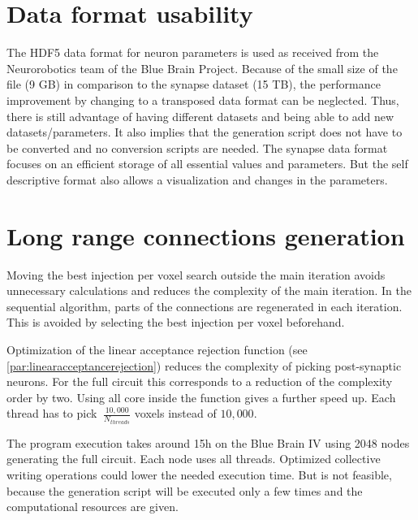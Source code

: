 \section{Data format usability}
The HDF5 data format for neuron parameters is used as received from the Neurorobotics team of the Blue Brain Project.
Because of the small size of the file (9 GB) in comparison to the synapse dataset (15 TB), the performance improvement by changing
to a transposed data format can be neglected. Thus, there is still advantage of having different datasets and being able
to add new datasets/parameters. It also implies that the generation script does not have to be converted and no 
conversion scripts are needed. The synapse data format focuses on an efficient storage of all essential values and parameters.
But the self descriptive format also allows a visualization and changes in the parameters.

\section{Long range connections generation}
Moving the best injection per voxel search outside the main iteration
avoids unnecessary calculations and reduces the complexity of the main iteration.
In the sequential algorithm, parts of the connections are regenerated in each iteration.
This is avoided by selecting the best injection per voxel beforehand.

Optimization of the linear acceptance rejection function (see \ref{par:linearacceptancerejection})
reduces the complexity of picking post-synaptic neurons.
For the full circuit this corresponds to a reduction of the complexity order  by two.
Using all core inside the function gives a further speed up.
Each thread has to pick $~\frac{10,000}{N_{threads}}$ voxels instead of
$10,000$.

The program execution takes around 15h on the Blue Brain IV using 2048 nodes generating the full circuit.
Each node uses all threads. Optimized collective writing operations could 
lower the needed execution time.
But is not feasible, because the generation script will be executed only a few times
and the computational resources are given.

